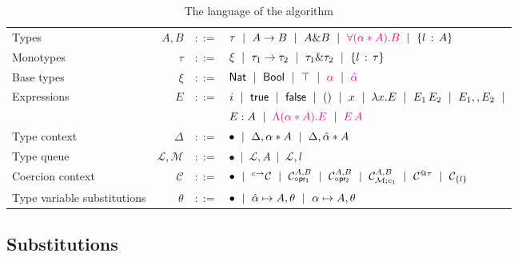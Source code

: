 \documentclass{article}
\begin{document}
\begin{table}[h]
  \begin{tabular}{l r r l}
    Types         & $A, B$   & $::=$ & $\tau~\mid~A \to B~\mid~A \& B~\mid~\textcolor{magenta}{\Tabs{\alpha}{A}{B}}~\mid~\trecord{l}{A}$\vspace{0.1cm}\\
    Monotypes     & $\tau$   & $::=$ & $\xi~\mid~\tau_1\to\tau_2~\mid~\tau_1\&\tau_2~\mid~\trecord{l}{\tau}$ \vspace{0.1cm}\\
    Base types    & $\xi$    & $::=$ & $\nat~\mid~\bool~\mid~\top~\mid~\textcolor{magenta}{\alpha}~\mid~\textcolor{magenta}{\hat{\alpha}}$ \vspace{0.3cm}\\
    Expressions   & $E$      & $::=$ & $i~\mid~\True~\mid~\False~\mid~()~\mid~x~\mid~\abs{x}{E}~\mid~E_1\,E_2~\mid~E_1,,E_2~\mid$\vspace{0.1cm}\\
                  &          &       & $E : A~\mid~\textcolor{magenta}{\tabs{\alpha}{A}{E}}~\mid~\textcolor{magenta}{E\,A}$\vspace{0.3cm}\\
    Type context  & $\Delta$ & $::=$ & $\bullet~\mid~\Delta,\tentry{\alpha}{A}~\mid~\Delta,\tentry{\hat{\alpha}}{A}$\vspace{0.3cm}\\
    Type queue    & $\mathcal{L},\mathcal{M}$ & $::=$ & $\bullet~\mid~\mathcal{L},A~\mid~\mathcal{L},l$\vspace{0.3cm}\\
    Coercion context & $\mathcal{C}$ & $::=$ & $\bullet~\mid~\arrCC{\mathcal{C}}{c}~\mid~\projlCC{\mathcal{C}}{A}{B}~\mid~\projrCC{\mathcal{C}}{A}{B}~\mid~\mpCC{\mathcal{C}}{\mathcal{M}}{c_1}{A}{B}~\mid~\alllCC{\mathcal{C}}{\tau}~\mid~\recCC{\mathcal{C}}{l}$\vspace{0.3cm}\\
    Type variable substitutions & $\theta$ & $::=$ & $\bullet~\mid~\unification{\alpha}{A},\theta~\mid~\substitution{\alpha}{A},\theta$\vspace{0.3cm}
  \end{tabular}
  \caption{The language of the algorithm}
\end{table}

\subsection{Substitutions}
\end{document}
